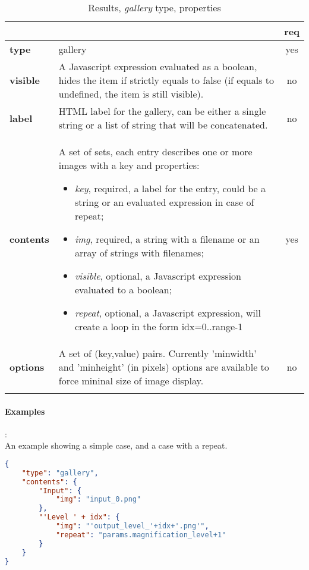 \begin{longtable}{|>{\bf}L{\linewidth}|L{\linewidth}|c|}
\hline
      &  & {\bf req} 
\tabularnewline \hline \hline
 type       & gallery  & yes \\ \hline
 visible    & A Javascript expression evaluated as a boolean, hides the item if
              strictly equals to false (if equals to undefined, the item is still visible).& no \\ \hline
 label      & HTML label for the gallery, can be either a single string or 
             a list of string that will be concatenated. & no \\ \hline
 contents   & A set of sets, each entry describes one or more images with a key and properties:
\vspace{-1em}
\begin{itemize}
    \setlength\itemsep{-0.5em}
    \item \textit{key}, required, a label for the entry, could be a string or an evaluated expression in case of repeat;
    \item \textit{img}, required, a string with a filename or an array of strings with filenames;
    \item \textit{visible}, optional, a Javascript expression evaluated to a boolean;
    \item \textit{repeat}, optional, a Javascript expression, will create a loop in the form idx=0..range-1
\end{itemize} 
\vspace{-1em} & yes \\ \hline
 options    & A set of (key,value) pairs. Currently
              'minwidth' and 'minheight' (in pixels) options are available to force
              mininal size of image display. & no \\ \hline
\caption{Results, \emph{gallery} type, properties}
\end{longtable}

\paragraph{Examples}:\\
An example showing a simple case, and a case with a repeat.
\begin{lstlisting}[language=json,firstnumber=1]
{
  	"type": "gallery",
    "contents": {
        "Input": {
            "img": "input_0.png"
        },
        "'Level ' + idx": {
            "img": "'output_level_'+idx+'.png'",
            "repeat": "params.magnification_level+1"
        }
    }
}
\end{lstlisting}


